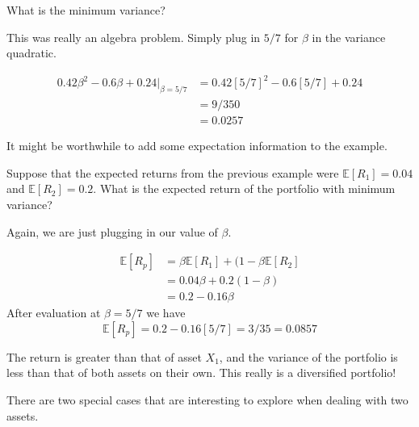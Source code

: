 \documentclass{ximera}
\begin{document}
\begin{question}
What is the minimum variance?

	\begin{multipleChoice}
	\end{multipleChoice}

\end{question}

\begin{solution}
This was really an algebra problem. Simply plug in $5/7$ for $\beta$ in the variance quadratic.

	\begin{align*}
	0.42\beta^2-0.6\beta+0.24\vert_{\beta=5/7}	&=0.42[5/7]^2-0.6[5/7]+0.24\\
									&=9/350\\
									&=0.0257
	\end{align*}
\end{solution}

It might be worthwhile to add some expectation information to the example.

\begin{example}
Suppose that the expected returns from the previous example were $\mathbb{E}[R_1]=0.04$ and $\mathbb{E}[R_2]=0.2$. What is the expected return of the portfolio with minimum variance?
\end{example}

\begin{solution}
Again, we are just plugging in our value of $\beta$.

	\begin{align*}
	\mathbb{E}[R_p] 	&=\beta\mathbb{E}[R_1]+(1-\beta\mathbb{E}[R_2]\\
				&=0.04\beta+0.2(1-\beta)\\
				&=0.2-0.16\beta
	\end{align*}
After evaluation at $\beta=5/7$ we have
	\begin{equation*}
	\mathbb{E}[R_p]=0.2-0.16[5/7]=3/35=0.0857
	\end{equation*}
\end{solution}

The return is greater than that of asset $X_1$, and the variance of the portfolio is less than that of both assets on their own. This really is a diversified portfolio!

There are two special cases that are interesting to explore when dealing with two assets.
\end{document}
